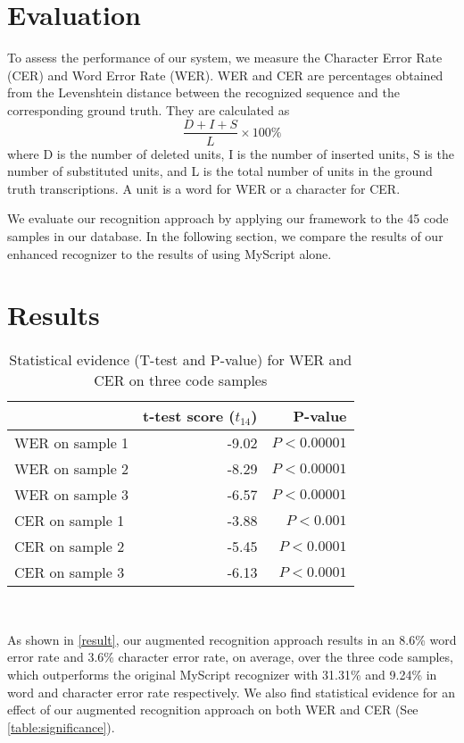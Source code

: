 \documentclass{vgtc}                          %
\begin{document}
\section{Evaluation}


To assess the performance of our system, we measure the Character Error Rate (CER) and Word Error Rate (WER). WER and CER are percentages obtained from the Levenshtein distance between the recognized sequence and the corresponding ground truth. They are calculated as
\[ \frac{D+I+S}{L} \times 100\% \]
where D is the number of deleted units, I is the number of inserted
units, S is the number of substituted units, and L is the total number of
units in the ground truth transcriptions. A unit is a word for WER or a
character for CER.


We evaluate our recognition approach by applying our framework to the 45 code samples in our database. In the following section, we compare the results of our enhanced recognizer to the results of using MyScript alone.

\section{Results} \label{results}

\begin{table}
  \centering
  \begin{tabular}{l r r}
    {}
    & {t-test score ($t_{14}$)}
      & {P-value} \\
    \midrule
    WER on sample 1 & -9.02 & $P < 0.00001$ \\
    WER on sample 2 & -8.29 & $P < 0.00001$ \\
    WER on sample 3 & -6.57 &  $P < 0.00001$  \\
    CER on sample 1 & -3.88  & $P < 0.001$  \\
    CER on sample 2 & -5.45 & $P < 0.0001$ \\
    CER on sample 3 & -6.13 & $P < 0.0001$ \\
  \end{tabular}
  \caption{Statistical evidence (T-test and P-value) for WER and CER on three code samples}~\label{table:significance}
\end{table}


As shown in \autoref{result}, 
our augmented recognition approach results in an 8.6\% word error rate and 3.6\% character error rate, on average, over the three code samples, which outperforms the original MyScript recognizer with 31.31\%  and 9.24\% in word and character error rate respectively. We also find statistical evidence for an effect of our augmented recognition approach on both WER and CER (See \autoref{table:significance}). 
\end{document}
